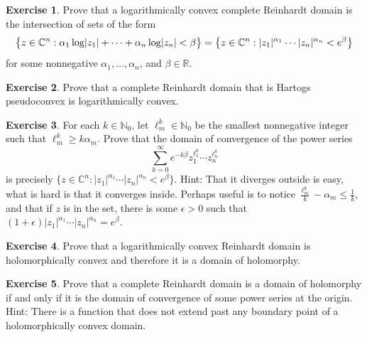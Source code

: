 \documentclass[12pt,openany]{book}
\newcommand{\avoidbreak}{\postdisplaypenalty=100}
\newcommand{\sabs}[1]{\lvert {#1} \rvert}
\newcommand{\C}{{\mathbb{C}}}
\newcommand{\R}{{\mathbb{R}}}
\newcommand{\N}{{\mathbb{N}}}
\theoremstyle{plain}
\theoremstyle{remark}
\theoremstyle{definition}
\newenvironment{exbox}{%
    \def\FrameCommand{\vrule width 1pt \relax\hspace{10pt}}%
    \MakeFramed{\advance\hsize-\width\FrameRestore}%
}{%
    \endMakeFramed
}
\theoremstyle{exercise}
\newtheorem{exercise}{Exercise}[section]
\theoremstyle{example}
\begin{document}
\begin{exbox}
\begin{exercise}
Prove that a logarithmically convex complete Reinhardt domain
is the intersection of sets of the form
\begin{equation*}
\bigl\{ z \in \C^n : \alpha_1 \log \sabs{z_1} + \cdots + \alpha_n \log
\sabs{z_n} < \beta  \bigr\}
=
\bigl\{ z \in \C^n : \sabs{z_1}^{\alpha_1} \cdots \sabs{z_n}^{\alpha_n}
< e^\beta \bigr\}
\avoidbreak
\end{equation*}
for some nonnegative $\alpha_1,\ldots,\alpha_n$, and $\beta \in \R$.
\end{exercise}

\begin{exercise}
Prove that a complete Reinhardt domain that is Hartogs
pseudoconvex is logarithmically convex.
\end{exercise}

\begin{exercise}
\pagebreak[2]
For each $k \in \N_0$, let $\ell_m^k \in \N_0$ be the smallest nonnegative integer such that
$\ell_m^k \geq k \alpha_m$.
Prove that the domain of convergence of the power series
\begin{equation*}
\sum_{k=0}^\infty e^{-k\beta}
z_1^{\ell_1^k}
\cdots
z_n^{\ell_n^k}
\end{equation*}
is precisely
$\bigl\{ z \in \C^n :
\sabs{z_1}^{\alpha_1} \cdots \sabs{z_n}^{\alpha_n}
< e^\beta \bigr\}$.
Hint: That it diverges outside is easy, what is hard is that it converges
inside.  Perhaps useful is to notice
$\frac{\ell_m^k}{k}-\alpha_m \leq \frac{1}{k}$, and
that if $z$ is in the set, there is some $\epsilon > 0$ such that
$(1+\epsilon)\sabs{z_1}^{\alpha_1} \cdots \sabs{z_n}^{\alpha_n} =
e^{\beta}$.
\end{exercise}

\begin{exercise}
Prove that a logarithmically convex Reinhardt domain is holomorphically
convex and therefore it is a domain of holomorphy.
\end{exercise}

\begin{exercise}
Prove that a complete Reinhardt domain is
a domain of holomorphy if and only if it is the
domain of convergence of some power series at the origin.  Hint: There is a
function that does not extend past any boundary point of a holomorphically
convex domain.
\end{exercise}
\end{exbox}
\end{document}
